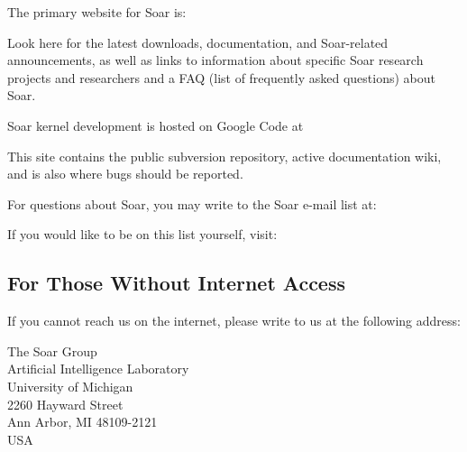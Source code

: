 The primary website for Soar is:

\hspace{2em}

Look here for the latest downloads, documentation, and Soar-related announcements, as well
as links to information about specific Soar research projects and researchers and a FAQ
(list of frequently asked questions) about Soar.

Soar kernel development is hosted on Google Code at

\hspace{2em}

This site contains the public subversion repository, active
documentation wiki, and is also where bugs should be reported.

For questions about Soar, you may write to the Soar e-mail list at:

\hspace{2em}

If you would like to be on this list yourself, visit:

\hspace{2em}





\subsection*{For Those Without Internet Access}

If you cannot reach us on the internet, please write to us at the following 
address:

\begin{flushleft}
\hspace{2em}The Soar Group \\
\hspace{2em}Artificial Intelligence Laboratory \\
\hspace{2em}University of Michigan\\
\hspace{2em}2260 Hayward Street\\
\hspace{2em}Ann Arbor, MI 48109-2121 \\
\hspace{2em}USA 
\end{flushleft}

